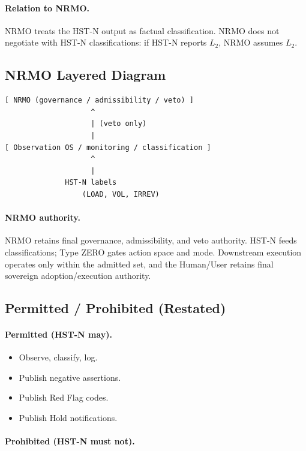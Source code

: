 \paragraph{Relation to NRMO.}
NRMO treats the HST-N output as factual classification. NRMO does
not negotiate with HST-N classifications: if HST-N reports $L_2$,
NRMO assumes $L_2$.

\subsection{NRMO Layered Diagram}
\label{sec:hstn-nrmo-layered-diagram-c2}

\begin{lstlisting}[basicstyle=\ttfamily\small,frame=single]
[ NRMO (governance / admissibility / veto) ]
                    ^
                    | (veto only)
                    |
[ Observation OS / monitoring / classification ]
                    ^
                    |
              HST-N labels
                  (LOAD, VOL, IRREV)
\end{lstlisting}

\paragraph{NRMO authority.}
NRMO retains final governance, admissibility, and veto authority. HST-N
feeds classifications; Type ZERO gates action space and mode. Downstream
execution operates only within the admitted set, and the Human/User retains
final sovereign adoption/execution authority.

\subsection{Permitted / Prohibited (Restated)}
\label{sec:hstn-permitted-prohibited-c2}

\paragraph{Permitted (HST-N may).}

\begin{itemize}
\item Observe, classify, log.
\item Publish negative assertions.
\item Publish Red Flag codes.
\item Publish Hold notifications.
\end{itemize}

\paragraph{Prohibited (HST-N must not).}


